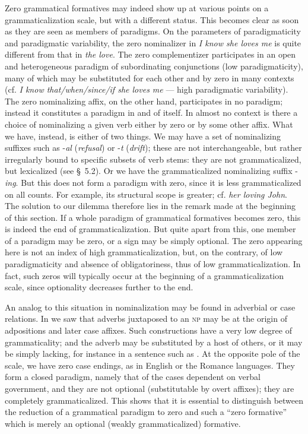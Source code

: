 Zero grammatical formatives may indeed show up at various points on a grammaticalization scale, but with a different status. This becomes clear as soon as they are seen as members of paradigms. On the parameters of paradigmaticity and paradigmatic variability, the zero nominalizer in \textit{I know she loves me} is quite different from that in \textit{the love}. The zero complementizer participates in an open and heterogeneous paradigm of subordinating conjunctions (low paradigmaticity), many of which may be substituted for each other and by zero in many contexts (cf. \textit{I know that/when/since/if she loves me} — high paradigmatic variability). The zero nominalizing affix, on the other hand, participates in no paradigm; instead it constitutes a paradigm in and of itself. In almost no context is there a choice of nominalizing a given verb either by zero or by some other affix. What we have, instead, is either of two things. We may have a set of nominalizing suffixes such as -\textit{al} (\textit{refusal}) or -\textit{t} (\textit{drift}); these are not interchangeable, but rather irregularly bound to specific subsets of verb stems: they are not grammaticalized, but lexicalized (see §~5.2). Or we have the grammaticalized nominalizing suffix -\textit{ing}. But this does not form a paradigm with zero, since it is less grammaticalized on all counts. For example, its structural scope is greater; cf. \textit{her loving John}. The solution to our dilemma therefore lies in the remark made at the beginning of this section. If a whole paradigm of grammatical formatives becomes zero, this is indeed the end of grammaticalization. But quite apart from this, one member of a paradigm may be zero, or a sign may be simply optional. The zero appearing here is not an index of high grammaticalization, but, on the contrary, of low paradigmaticity and absence of obligatoriness, thus of low grammaticalization. In fact, such zeros will typically occur at the beginning of a grammaticalization scale, since optionality decreases further to the end.

An analog to this situation in nominalization may be found in adverbial or case relations. In  we saw that adverbs juxtaposed to an \textsc{np} may be at the origin of adpositions and later case affixes. Such constructions have a very low degree of grammaticality; and the adverb may be substituted by a host of others, or it may be simply lacking, for instance in a sentence such as . At the opposite pole of the scale, we have zero case endings, as in English or the Romance languages. They form a closed paradigm, namely that of the cases dependent on verbal government, and they are not optional (substitutable by overt affixes); they are completely grammaticalized. This shows that it is essential to distinguish between the reduction of a grammatical paradigm to zero and such a “zero formative” which is merely an optional (weakly grammaticalized) formative.

